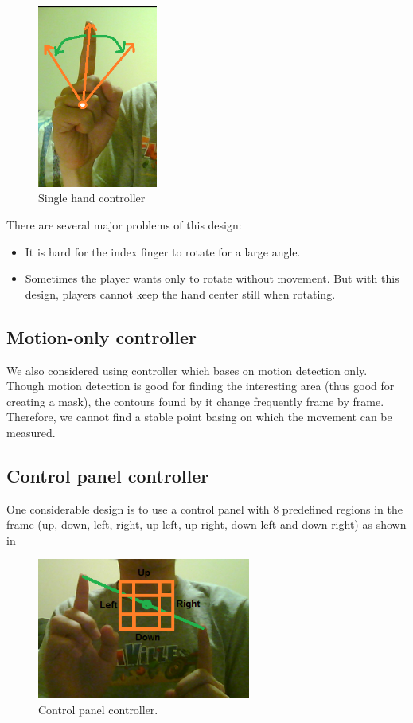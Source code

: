 \documentclass[10pt,twocolumn,letterpaper]{article}
\begin{document}
\begin{figure}[h]
\centering
\includegraphics[height=6cm]{singlehand.png}
\caption{Single hand controller}
\label{fig:singlehand}
\end{figure}

There are several major problems of this design:
\begin{itemize}
	\item It is hard for the index finger to rotate for a large angle.
	\item Sometimes the player wants only to rotate without movement. 
	But with this design, players cannot keep the hand center still when rotating. 
\end{itemize}

\subsection{Motion-only controller}
We also considered using controller which bases on motion detection only. 
Though motion detection is good for finding the interesting area (thus good 
for creating a mask), the contours found by it change frequently frame by frame. 
Therefore, we cannot find a stable point basing on which the movement can be measured.

\subsection{Control panel controller}
One considerable design is to use a control panel with 8 predefined regions 
in the frame (up, down, left, right, up-left, up-right, down-left and down-right) 
as shown in 

\begin{figure}[h]
\centering
\includegraphics[width=7cm]{controlpanel.png}
\caption{Control panel controller.}
\label{fig:controlpanel}
\end{figure}
\end{document}
